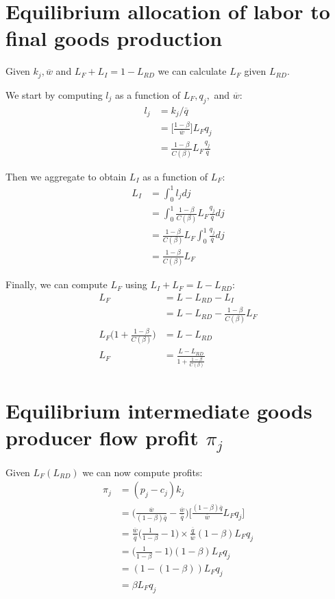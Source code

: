 \documentclass[11pt,english]{article}
\theoremstyle{remark}
\begin{document}
\section{Equilibrium allocation of labor to final goods production}
Given $k_j,\overline{w}$ and $L_F + L_I  = 1 - L_{RD}$ we can calculate $L_F$ given $L_{RD}$. 

We start by computing $l_j$ as a function of $L_F, q_j,$ and $\overline{w}$:
\begin{align*}
	l_j &= k_j / \overline{q} \\
		&=  \Big[ \frac{1-\beta}{\overline{w}} \Big]L_F   q_j \\
		&= \frac{1-\beta}{C(\beta)} L_F \frac{q_j}{\overline{q}}
\end{align*}

Then we aggregate to obtain $L_I$ as a function of $L_F$:
\begin{align*}
	L_I &= \int_0^1 l_j dj \\
	    &= \int_0^1 \frac{1-\beta}{C(\beta)} L_F \frac{q_j}{\overline{q}} dj \\
	    &= \frac{1-\beta}{C(\beta)} L_F \int_0^1 \frac{q_j}{\overline{q}} dj \\
	    &= \frac{1-\beta}{C(\beta)} L_F 
\end{align*}

Finally, we can compute $L_F$ using $L_I + L_F = L - L_{RD}$: 
\begin{align*}
	L_F &= L - L_{RD} - L_I \\
	    &= L - L_{RD} - \frac{1-\beta}{C(\beta)} L_F \\
	L_F \Big( 1 +  \frac{1-\beta}{C(\beta)} \Big) &= L - L_{RD} \\
	L_F &= \frac{L - L_{RD}}{1 +  \frac{1-\beta}{C(\beta)}}
\end{align*}

\section{Equilibrium intermediate goods producer flow profit $\pi_j$}

Given $L_F(L_{RD})$ we can now compute profits:
\begin{align*}
	\pi_j &= (p_j - c_j) k_j \\
	      &= \Big( \frac{\overline{w}}{(1-\beta)\overline{q}} - \frac{\overline{w}}{\overline{q}} \Big) \Big[ \frac{(1-\beta) \overline{q}}{\overline{w}} L_F q_j  \Big] \\
	      &= \frac{\overline{w}}{\overline{q}} \Big( \frac{1}{1-\beta} - 1 \Big) \times \frac{\overline{q}}{\overline{w}} (1-\beta) L_F q_j \\
	      &= \Big( \frac{1}{1-\beta} - 1 \Big) (1-\beta) L_F q_j \\
	      &= (1 - (1-\beta)) L_F q_j \\
	      &= \beta L_F q_j 
\end{align*}
\end{document}
